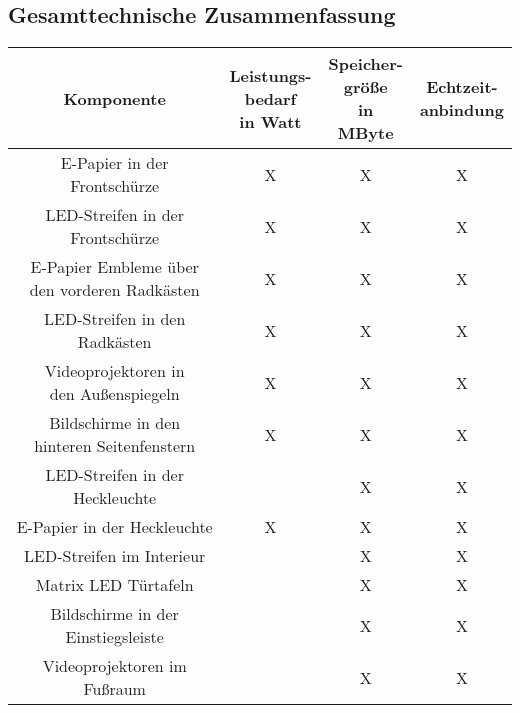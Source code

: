 \subsection{Gesamttechnische Zusammenfassung}
\begin{table}[hbt]	
	\centering
	\renewcommand{\arraystretch}{1.5}	%
	\label{tab:Werte}
	\begin{tabular}{c|ccc}
		\textbf{Komponente} & \parbox[t]{0.16\linewidth}{\centering Leistungs-\\bedarf\\in Watt} & \parbox[t]{0.16\linewidth}{\centering Speicher-\\größe\\in MByte} & \parbox[t]{0.16\linewidth}{\centering Echtzeit-\\anbindung} \\ 
		\hline 
		\hline 
		\parbox[t]{0.4\linewidth}{\centering E-Papier in der Frontschürze} & X & X & X \\
		\parbox[t]{0.4\linewidth}{\centering LED-Streifen in der Frontschürze} & X & X & X \\
		\parbox[t]{0.4\linewidth}{\centering E-Papier Embleme über\\den vorderen Radkästen} & X & X & X \\
		\parbox[t]{0.4\linewidth}{\centering LED-Streifen in den Radkästen} & X & X & X \\
		\parbox[t]{0.4\linewidth}{\centering Videoprojektoren in\\den Außenspiegeln} & X & X & X \\
		\parbox[t]{0.4\linewidth}{\centering Bildschirme in den\\hinteren Seitenfenstern} & X & X & X \\
		\parbox[t]{0.4\linewidth}{\centering LED-Streifen in der Heckleuchte} &  & X & X \\
		\parbox[t]{0.4\linewidth}{\centering E-Papier in der Heckleuchte} & X & X & X \\
		\parbox[t]{0.4\linewidth}{\centering LED-Streifen im Interieur} &  & X & X \\
		\parbox[t]{0.4\linewidth}{\centering Matrix LED Türtafeln} &  & X & X \\
		\parbox[t]{0.4\linewidth}{\centering Bildschirme in der Einstiegsleiste} &  & X & X \\
		\parbox[t]{0.4\linewidth}{\centering Videoprojektoren im Fußraum} &  & X & X \\

\end{tabular}
\end{table}
